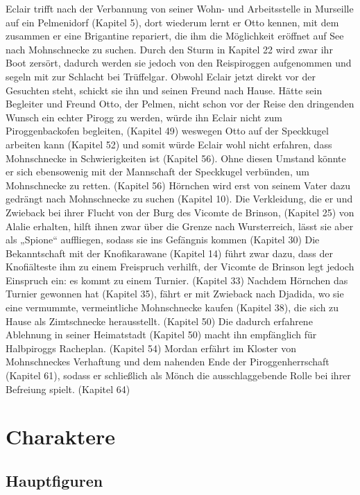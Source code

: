 Eclair trifft nach der Verbannung von seiner Wohn- und Arbeitsstelle in Murseille auf ein Pelmenidorf (Kapitel 5), dort wiederum lernt er Otto kennen, mit dem zusammen er eine Brigantine repariert, die ihm die Möglichkeit eröffnet auf See nach Mohnschnecke zu suchen. Durch den Sturm in Kapitel 22 wird zwar ihr Boot zersört, dadurch werden sie jedoch von den Reispiroggen aufgenommen und segeln mit zur Schlacht bei Trüffelgar. Obwohl Eclair jetzt direkt vor der Gesuchten steht, schickt sie ihn und seinen Freund nach Hause. Hätte sein Begleiter und Freund Otto, der Pelmen, nicht schon vor der Reise den dringenden Wunsch ein echter Pirogg zu werden, würde ihn Eclair nicht zum Piroggenbackofen begleiten, (Kapitel 49) weswegen Otto auf der Speckkugel arbeiten kann (Kapitel 52) und somit würde Eclair wohl nicht erfahren, dass Mohnschnecke in Schwierigkeiten ist (Kapitel 56). Ohne diesen Umstand könnte er sich ebensowenig mit der Mannschaft der Speckkugel verbünden, um Mohnschnecke zu retten. (Kapitel 56) Hörnchen wird erst von seinem Vater dazu gedrängt nach Mohnschnecke zu suchen (Kapitel 10). Die Verkleidung, die er und Zwieback bei ihrer Flucht von der Burg des Vicomte de Brinson, (Kapitel 25) von Alalie erhalten, hilft ihnen zwar über die Grenze nach Wursterreich, lässt sie aber als „Spione“ auffliegen, sodass sie ins Gefängnis kommen (Kapitel 30) Die Bekanntschaft mit der Knofikarawane (Kapitel 14) führt zwar dazu, dass der Knofiälteste ihm zu einem Freispruch verhilft, der Vicomte de Brinson legt jedoch Einspruch ein: es kommt zu einem Turnier. (Kapitel 33) Nachdem Hörnchen das Turnier gewonnen hat (Kapitel 35), fährt er mit Zwieback nach Djadida, wo sie eine vermummte, vermeintliche Mohnschnecke kaufen (Kapitel 38), die sich zu Hause als Zimtschnecke herausstellt. (Kapitel 50) Die dadurch erfahrene Ablehnung in seiner Heimatstadt (Kapitel 50) macht ihn empfänglich für Halbpiroggs Racheplan. (Kapitel 54) Mordan erfährt im Kloster von Mohnschneckes Verhaftung und dem nahenden Ende der Piroggenherrschaft (Kapitel 61), sodass er schließlich als Mönch die ausschlaggebende Rolle bei ihrer Befreiung spielt. (Kapitel 64)


\section{Charaktere}
\subsection{Hauptfiguren}

